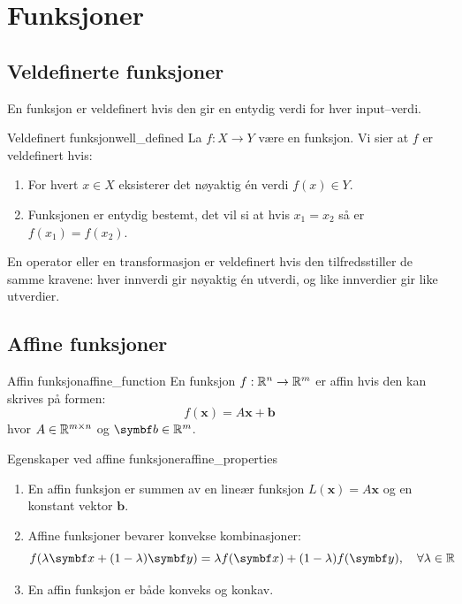 \section{Funksjoner}

\subsection{Veldefinerte funksjoner}
En funksjon er veldefinert hvis den gir en entydig verdi for hver input--verdi.
\begin{definition}{Veldefinert funksjon}{well_defined}
	La \( f: X \to Y \) være en funksjon. Vi sier at \( f \) er veldefinert hvis:
	\begin{enumerate}
		\item For hvert \( x \in X \) eksisterer det nøyaktig én verdi \( f(x) \in Y \).
		\item Funksjonen er entydig bestemt, det vil si at hvis \( x_1 = x_2 \) så er \( f(x_1) = f(x_2) \).
	\end{enumerate}

	En operator eller en transformasjon er veldefinert hvis den tilfredsstiller de samme kravene: hver innverdi gir nøyaktig én utverdi, og like innverdier gir like utverdier.
\end{definition}

\subsection{Affine funksjoner}
\begin{definition}{Affin funksjon}{affine_function}
	En funksjon $f: \mathbb{R}^n \to \mathbb{R}^m$ er affin hvis den kan skrives på formen:
	\[
		f(\mathbf{x}) = A\mathbf{x} + \mathbf{b}
	\]
	hvor $A \in \mathbb{R}^{m \times n}$ og $\mathbf{b} \in \R^m$.
\end{definition}

\begin{remark}{Egenskaper ved affine funksjoner}{affine_properties}
	\begin{enumerate}
		\item En affin funksjon er summen av en lineær funksjon $L(\mathbf{x}) = A\mathbf{x}$ og en konstant vektor $\mathbf{b}$.
		\item Affine funksjoner bevarer konvekse kombinasjoner:
			  \[
				  f(\lambda \mathbf{x} + (1-\lambda)\mathbf{y}) = \lambda f(\mathbf{x}) + (1-\lambda)f(\mathbf{y}), \quad \forall \lambda \in \R
			  \]
		\item En affin funksjon er både konveks og konkav.
	\end{enumerate}
\end{remark}

